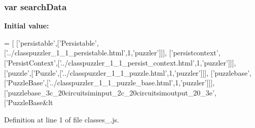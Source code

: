 \subsubsection[{search\+Data}]{\setlength{\rightskip}{0pt plus 5cm}var search\+Data}\label{a00067_ad01a7523f103d6242ef9b0451861231e}
{\bfseries Initial value\+:}
\begin{DoxyCode}
=
[
  [\textcolor{stringliteral}{'persistable'},[\textcolor{stringliteral}{'Persistable'},[\textcolor{stringliteral}{'../classpuzzler\_1\_1\_persistable.html'},1,\textcolor{stringliteral}{'puzzler'}]]],
  [\textcolor{stringliteral}{'persistcontext'},[\textcolor{stringliteral}{'PersistContext'},[\textcolor{stringliteral}{'../classpuzzler\_1\_1\_persist\_context.html'},1,\textcolor{stringliteral}{'puzzler'}]]],
  [\textcolor{stringliteral}{'puzzle'},[\textcolor{stringliteral}{'Puzzle'},[\textcolor{stringliteral}{'../classpuzzler\_1\_1\_puzzle.html'},1,\textcolor{stringliteral}{'puzzler'}]]],
  [\textcolor{stringliteral}{'puzzlebase'},[\textcolor{stringliteral}{'PuzzleBase'},[\textcolor{stringliteral}{'../classpuzzler\_1\_1\_puzzle\_base.html'},1,\textcolor{stringliteral}{'puzzler'}]]],
  [\textcolor{stringliteral}{'puzzlebase\_3c\_20circuitsiminput\_2c\_20circuitsimoutput\_20\_3e'},[\textcolor{stringliteral}{'PuzzleBase&lt}
\end{DoxyCode}


Definition at line 1 of file classes\+\_.\+js.

